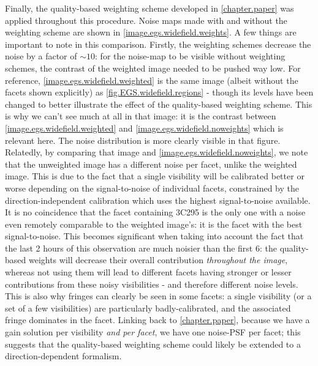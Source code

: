 \pg
Finally, the quality-based weighting scheme developed in \cref{chapter.paper} was applied throughout this procedure. Noise maps made with and without the weighting scheme are shown in \cref{image.egs.widefield.weights}. A few things are important to note in this comparison. Firstly, the weighting schemes decrease the noise by a factor of $\sim10$: for the noise-map to be visible without weighting schemes, the contrast of the weighted image needed to be pushed way low. For reference, \cref{image.egs.widefield.weighted} is the same image (albeit without the facets shown explicitly) as \cref{fig.EGS.widefield.regions} - though its levels have been changed to better illustrate the effect of the quality-based weighting scheme. This is why we can't see much at all in that image: it is the contrast between \cref{image.egs.widefield.weighted} and \cref{image.egs.widefield.noweights} which is relevant here. The noise distribution is more clearly visible in that figure. Relatedly, by comparing that image and \cref{image.egs.widefield.noweights}, we note that the unweighted image has a different noise per facet, unlike the weighted image. This is due to the fact that a single visibility will be calibrated better or worse depending on the signal-to-noise of individual facets, constrained by the direction-independent calibration which uses the highest signal-to-noise available. It is no coincidence that the facet containing 3C295 is the only one with a noise even remotely comparable to the weighted image's: it is the facet with the best signal-to-noise. This becomes significant when taking into account the fact that the last 2 hours of this observation are much noisier than the first 6: the quality-based weights will decrease their overall contribution \textit{throughout the image}, whereas not using them will lead to different facets having stronger or lesser contributions from these noisy visibilities - and therefore different noise levels. This is also why fringes can clearly be seen in some facets: a single visibility (or a set of a few visibilities) are particularly badly-calibrated, and the associated fringe dominates in the facet. Linking back to \cref{chapter.paper}, because we have a gain solution per visibility \textit{and per facet}, we have one noise-PSF per facet; this suggests that the quality-based weighting scheme could likely be extended to a direction-dependent formalism.

